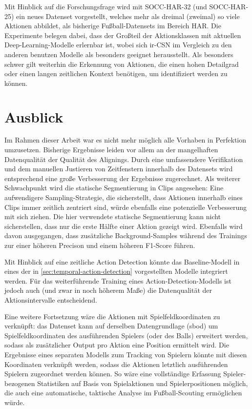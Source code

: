 Mit Hinblick auf die Forschungsfrage wird mit SOCC-HAR-32 (und SOCC-HAR-25) ein neues Datenset vorgestellt, welches mehr als dreimal (zweimal) so viele Aktionen abbildet, als bisherige Fußball-Datensets im Bereich HAR.
Die Experimente belegen dabei, dass der Großteil der Aktionsklassen mit aktuellen Deep-Learning-Modelle erlernbar ist, wobei sich ir-CSN im Vergleich zu den anderen benutzen Modelle als besonders geeignet herausstellt.
Als besonders schwer gilt weiterhin die Erkennung von Aktionen, die einen hohen Detailgrad oder einen langen zeitlichen Kontext benötigen, um identifiziert werden zu können.

\section{Ausblick}
\label{sec:ausblick}

Im Rahmen dieser Arbeit war es nicht mehr möglich alle Vorhaben in Perfektion umzusetzen.
Bisherige Ergebnisse leiden vor allem an der mangelhaften Datenqualität \bzw der Qualität des Alignings.
Durch eine umfassendere Verifikation und dem manuellen Justieren von Zeitfenstern innerhalb des Datensets wird entsprechend eine große Verbesserung der Ergebnisse zugerechnet.
Als weiterer Schwachpunkt wird die statische Segmentierung in Clips angesehen:
Eine aufwendigere Sampling-Strategie, die sicherstellt, dass Aktionen innerhalb eines Clips immer zeitlich zentriert sind, würde ebenfalls eine potenzielle Verbesserung mit sich ziehen.
Die hier verwendete statische Segmentierung kann \zB nicht sicherstellen, dass nur die erste Hälfte einer Aktion gezeigt wird.
Ebenfalls wird davon ausgegangen, dass zusätzliche Background-Samples während des Trainings zur einer höheren Precison und einem höheren F1-Score führen.

Mit Hinblick auf eine zeitliche Action Detection könnte das Baseline-Modell in eines der in \autoref{sec:temporal-action-detection} vorgestellten Modelle integriert werden.
Für das weiterführende Training eines Action-Detection-Modells ist jedoch auch (und zwar in noch höherem Maße) die Datenqualität der Aktionsintervalle entscheidend.

Eine weitere Fortsetzung wäre die Aktionen mit Spielfeldkoordinaten zu verknüpft:
das Datenset kann auf derselben Datengrundlage (\gls{sbod}) um Spielfeldkoordinaten des ausführenden Spielers (oder des Balls) erweitert werden, sodass als zusätzlicher Output pro Aktion eine Position ermittelt wird.
Die Ergebnisse eines separaten Modells zum Tracking von Spielern könnte mit diesen Koordinaten verknüpft werden, sodass die Aktionen letztlich ausführenden Spielern zugeordnet werden können.
So wäre eine vollständige Erfassung Spieler-bezogenen Statistiken auf Basis von Spielaktionen und Spielerpositionen möglich, die auch eine automatische, taktische Analyse im Fußball-Scouting ermöglichen würde.

